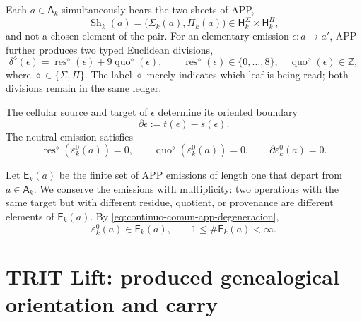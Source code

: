 Each \(a\in\mathsf A_k\) simultaneously bears the two sheets of APP,
\begin{equation}
\label{eq:continuo-comun-dos-hojas}
 \operatorname{Sh}_k(a)
 =\bigl(\Sigma_k(a),\Pi_k(a)\bigr)
 \in\mathsf H_k^{\Sigma}\times\mathsf H_k^{\Pi},
\end{equation}
and not a chosen element of the pair.  For an elementary emission
\(\epsilon:a\to a'\), APP further produces two typed Euclidean divisions,
\begin{equation}
\label{eq:continuo-comun-residuo-cociente-app}
 \delta^{\diamond}(\epsilon)
 =\operatorname{res}^{\diamond}(\epsilon)
  +9\operatorname{quo}^{\diamond}(\epsilon),
 \qquad
 \operatorname{res}^{\diamond}(\epsilon)\in\{0,\ldots,8\},
 \quad
 \operatorname{quo}^{\diamond}(\epsilon)\in\mathbb Z,
\end{equation}
where \(\diamond\in\{\Sigma,\Pi\}\).  The label \(\diamond\) merely indicates
which leaf is being read; both divisions remain in the same ledger.

The cellular source and target of \(\epsilon\) determine its oriented
boundary
\begin{equation}
\label{eq:continuo-comun-frontera-elemental}
 \partial\epsilon:=t(\epsilon)-s(\epsilon).
\end{equation}
The neutral emission satisfies
\begin{equation}
\label{eq:continuo-comun-neutral-app-datos}
 \operatorname{res}^{\diamond}(\varepsilon^0_k(a))=0,
 \qquad
 \operatorname{quo}^{\diamond}(\varepsilon^0_k(a))=0,
 \qquad
 \partial\varepsilon^0_k(a)=0.
\end{equation}

\begin{definition}
\label{def:continuo-comun-grafo-app}
Let \(\mathsf E_k(a)\) be the finite set of APP emissions of length one
that depart from \(a\in\mathsf A_k\).  We conserve the emissions with
multiplicity: two operations with the same target but with different
residue, quotient, or provenance are different elements of
\(\mathsf E_k(a)\).  By \eqref{eq:continuo-comun-app-degeneracion},
\begin{equation}
\label{eq:continuo-comun-out-no-vacio-app}
 \varepsilon^0_k(a)\in\mathsf E_k(a),
 \qquad
 1\leq \#\mathsf E_k(a)<\infty.
\end{equation}
\end{definition}

\section{TRIT Lift: produced genealogical orientation and carry}
\label{sec:continuo-comun-trit-lift}

